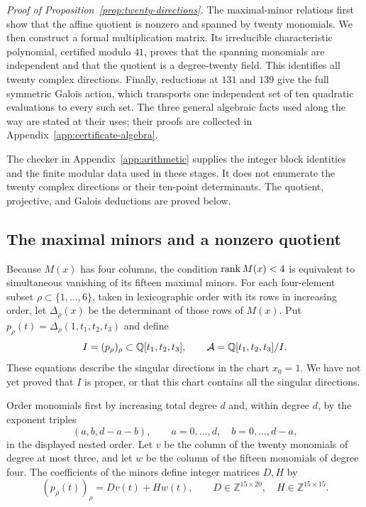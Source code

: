 \noindent\textit{Proof of Proposition~\ref{prop:twenty-directions}.}
The maximal-minor relations first show that the affine quotient is nonzero
and spanned by twenty monomials.  We then construct a formal multiplication
matrix.  Its irreducible characteristic polynomial, certified modulo $41$,
proves that the spanning monomials are independent and that the quotient
is a degree-twenty field.  This identifies all twenty complex directions.
Finally, reductions at $131$ and $139$ give the full symmetric Galois action,
which transports one independent set of ten quadratic evaluations to every
such set.  The three general algebraic facts used along the way are stated
at their uses; their proofs are collected in
Appendix~\ref{app:certificate-algebra}.

The checker in Appendix~\ref{app:arithmetic} supplies the integer block
identities and the finite modular data used in these stages.  It does not
enumerate the twenty complex directions or their ten-point determinants.
The quotient, projective, and Galois deductions are proved below.

\subsection{The maximal minors and a nonzero quotient}

Because $M(x)$ has four columns, the condition $\operatorname{rank} M(x)<4$ is equivalent
to simultaneous vanishing of its fifteen maximal minors.  For each
four-element subset $\rho\subset\{1,\ldots,6\}$, taken in lexicographic
order with its rows in increasing order, let $\Delta_\rho(x)$ be the
determinant of those rows of $M(x)$.  Put
$p_\rho(t)=\Delta_\rho(1,t_1,t_2,t_3)$ and define
\[
 I=(p_\rho)_\rho\subset\mathbb Q[t_1,t_2,t_3],\qquad
 \mathcal A=\mathbb Q[t_1,t_2,t_3]/I.
\]
These equations describe the singular directions in the chart $x_0=1$.
We have not yet proved that $I$ is proper, or that this chart contains all
the singular directions.

Order monomials first by increasing total degree $d$ and, within degree
$d$, by the exponent triples
\begin{equation}
 (a,b,d-a-b),\qquad a=0,\ldots,d,\quad b=0,\ldots,d-a,
 \label{eq:monomial-order}
\end{equation}
in the displayed nested order.  Let $v$ be the column of the twenty
monomials of degree at most three, and let $w$ be the column of the fifteen
monomials of degree four.  The coefficients of the minors define integer
matrices $D,H$ by
\begin{equation}
 (p_\rho(t))_\rho=Dv(t)+Hw(t),\qquad
 D\in\mathbb Z^{15\times20},\quad H\in\mathbb Z^{15\times15}.
 \label{eq:DH}
\end{equation}

